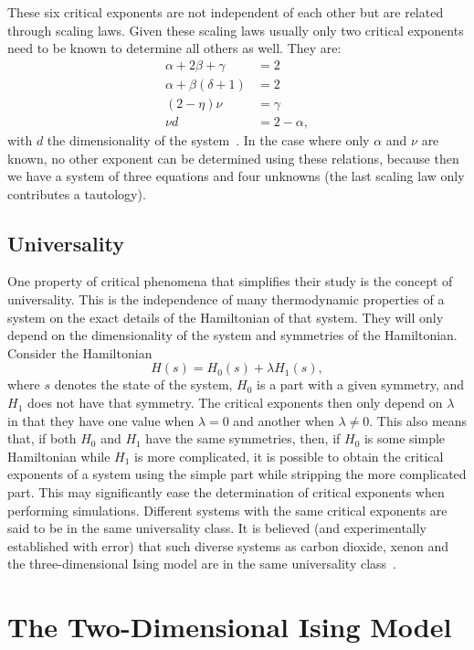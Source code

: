\documentclass[11pt, a4paper]{report} %
\begin{document}
These six critical exponents are not independent of each other but are related through scaling laws.
Given these scaling laws usually only two critical exponents need to be known to determine all others as well.
They are:
\begin{align}
	\alpha + 2\beta +\gamma &= 2\\
	\alpha + \beta(\delta+1) &= 2\\
	(2-\eta)\nu &= \gamma \\
	\nu d &= 2- \alpha,
\end{align}
with \(d\) the dimensionality of the system~\cite{binney:1992,baxter:1989,landau:2015}.
In the case where only \(\alpha\) and \(\nu\) are known, no other exponent can be determined using these relations, because then we have a system of three equations and four unknowns (the last scaling law only contributes a tautology).


\subsection{Universality}
One property of critical phenomena that simplifies their study is the concept of universality.
This is the independence of many thermodynamic properties of a system on the exact details of the Hamiltonian of that system.
They will only depend on the dimensionality of the system and symmetries of the Hamiltonian.
Consider the Hamiltonian
\begin{equation}
	H(s) = H_0(s) + \lambda H_1(s),
\end{equation}
where \(s\) denotes the state of the system, \(H_0\) is a part with a given symmetry, and \(H_1\) does not have that symmetry.
The critical exponents then only depend on \(\lambda\) in that they have one value when \(\lambda=0\) and another when \(\lambda \neq 0\).
This also means that, if both \(H_0\) and \(H_1\) have the same symmetries, then, if \(H_0\) is some simple Hamiltonian while \(H_1\) is more complicated, it is possible to obtain the critical exponents of a system using the simple part while stripping the more complicated part.
This may significantly ease the determination of critical exponents when performing simulations.
Different systems with the same critical exponents are said to be in the same universality class.
It is believed (and experimentally established with error) that such diverse systems as carbon dioxide, xenon and the three-dimensional Ising model are in the same universality class~\cite{baxter:1989}.

\section{The Two-Dimensional Ising Model}\label{sec:ising_model}
\end{document}
